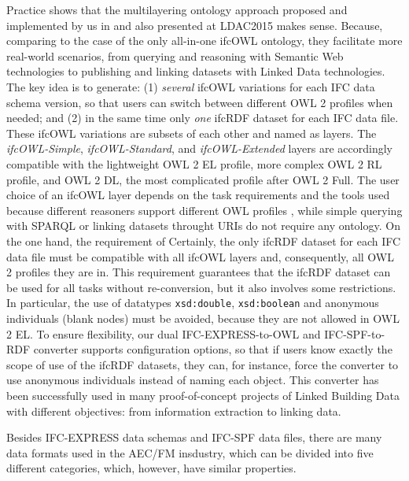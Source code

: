 Practice shows that the multilayering ontology approach proposed and implemented by us in \cite{vu2015implementation} and also presented at LDAC2015 makes sense.
Because, comparing to the case of the only all-in-one ifcOWL ontology, they facilitate more real-world scenarios, from querying and reasoning with Semantic Web technologies to publishing and linking datasets with Linked Data technologies.
The key idea is to generate: (1) \emph{several} {ifcOWL} variations for each IFC data schema version, so that users can switch between different OWL 2 profiles when needed; and (2) in the same time only \emph{one} {ifcRDF} dataset for each IFC data file. 
These {ifcOWL} variations are subsets of each other and named as layers.
The \emph{ifcOWL-Simple}, \emph{ifcOWL-Standard}, and \emph{ifcOWL-Extended} layers are accordingly compatible with the lightweight OWL 2 EL profile, more complex OWL 2 RL profile, and OWL 2 DL, the most complicated profile after OWL 2 Full.
The user choice of an ifcOWL layer depends on the task requirements and the tools used because different reasoners support different OWL profiles \cite{w3c2017owlimplementations, manchester2017reasoners}, while simple querying with SPARQL or linking datasets throught URIs do not require any ontology.
On the one hand, the requirement of 
Certainly, the only ifcRDF dataset for each IFC data file must be compatible with all ifcOWL layers and, consequently, all OWL 2 profiles they are in.
This requirement guarantees that the ifcRDF dataset can be used for all tasks without re-conversion, but it also involves some restrictions.
In particular, the use of datatypes \texttt{xsd:double}, \texttt{xsd:boolean} and anonymous individuals (blank nodes) must be avoided, because they are not allowed in OWL 2 EL.
To ensure flexibility, our dual IFC-EXPRESS-to-OWL and IFC-SPF-to-RDF converter supports configuration options, so that if users know exactly the scope of use of the ifcRDF datasets, they can, for instance, force the converter to use anonymous individuals instead of naming each object.
This converter has been successfully used in many proof-of-concept projects of Linked Building Data with different objectives: from information extraction to linking data.




Besides IFC-EXPRESS data schemas and IFC-SPF data files, there are many data formats used in the AEC/FM insdustry, which can be divided into five different categories, which, however, have similar properties.









